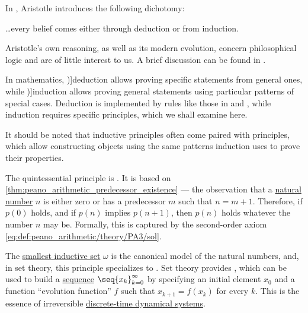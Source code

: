 \begin{concept}\label{con:induction}
  In \cite[104]{Aristotle1984CompleteWorks:PriorAnalytics}, Aristotle introduces the following dichotomy:
  \begin{displayquote}
    \ldots every belief comes either through deduction or from induction.
  \end{displayquote}

  Aristotle's own reasoning, as well as its modern evolution, concern philosophical logic and are of little interest to us. A brief discussion can be found in \cite[\S 1.3]{Hurley2023LogicIntroduction}.

  In mathematics, \term[en=deduction (\cite[29]{Aristotle1984CompleteWorks:PriorAnalytics})]{deduction} allows proving specific statements from general ones, while \term[en=induction (\cite[251]{Aristotle1984CompleteWorks:PriorAnalytics})]{induction} allows proving general statements using particular patterns of special cases. Deduction is implemented by rules like those in  and , while induction requires specific principles, which we shall examine here.

  It should be noted that inductive principles often come paired with  principles, which allow constructing objects using the same patterns induction uses to prove their properties.

  \begin{thmenum}
     The quintessential principle is . It is based on \cref{thm:peano_arithmetic_predecessor_existence} --- the observation that a \hyperref[def:natural_numbers]{natural number} \( n \) is either zero or has a predecessor \( m \) such that \( n = m + 1 \). Therefore, if \( p(0) \) holds, and if \( p(n) \) implies \( p(n + 1) \), then \( p(n) \) holds whatever the number \( n \) may be. Formally, this is captured by the second-order axiom \eqref{eq:def:peano_arithmetic/theory/PA3/sol}.

    The \hyperref[def:smallest_inductive_set]{smallest inductive set} \( \omega \) is the canonical model of the natural numbers, and, in set theory, this principle specializes to . Set theory provides , which can be used to build a \hyperref[def:sequence]{sequence} \( \seq{ x_k }_{k=0}^\infty \) by specifying an initial element \( x_0 \) and a function \enquote{evolution function} \( f \) such that \( x_{k+1} = f(x_k) \) for every \( k \). This is the essence of irreversible \hyperref[def:discrete_dynamical_system]{discrete-time dynamical systems}.


\end{thmenum}
\end{concept}
